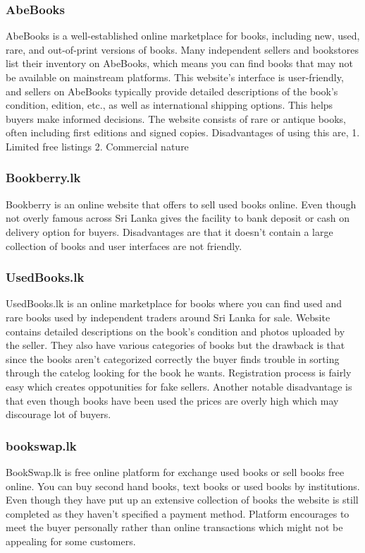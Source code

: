 \subsubsection{AbeBooks}
AbeBooks is a well-established online marketplace for books, including new,
used, rare, and out-of-print versions of books. Many independent sellers and
bookstores list their inventory on AbeBooks, which means you can find books
that may not be available on mainstream platforms. This website's interface is
user-friendly, and sellers on AbeBooks typically provide detailed descriptions
of the book's condition, edition, etc., as well as international shipping
options. This helps buyers make informed decisions. The website consists of
rare or antique books, often including first editions and signed copies.
Disadvantages of using this are, 1. Limited free listings 2. Commercial nature

\subsubsection{Bookberry.lk}
Bookberry is an online website that offers to sell used books online. Even
though not overly famous across Sri Lanka gives the facility to bank deposit or
cash on delivery option for buyers. Disadvantages are that it doesn't contain a
large collection of books and user interfaces are not friendly.

\subsubsection{UsedBooks.lk}
UsedBooks.lk is an online marketplace for books where you can find used and
rare books used by independent traders around Sri Lanka for sale. Website
contains detailed descriptions on the book's condition and photos uploaded by
the seller. They also have various categories of books but the drawback is that
since the books aren't categorized correctly the buyer finds trouble in sorting
through the catelog looking for the book he wants. Registration process is
fairly easy which creates oppotunities for fake sellers. Another notable
disadvantage is that even though books have been used the prices are overly
high which may discourage lot of buyers.

\subsubsection{bookswap.lk}
BookSwap.lk is free online platform for exchange used books or sell books free
online. You can buy second hand books, text books or used books by
institutions. Even though they have put up an extensive collection of books the
website is still completed as they haven't specified a payment method. Platform
encourages to meet the buyer personally rather than online transactions which
might not be appealing for some customers.